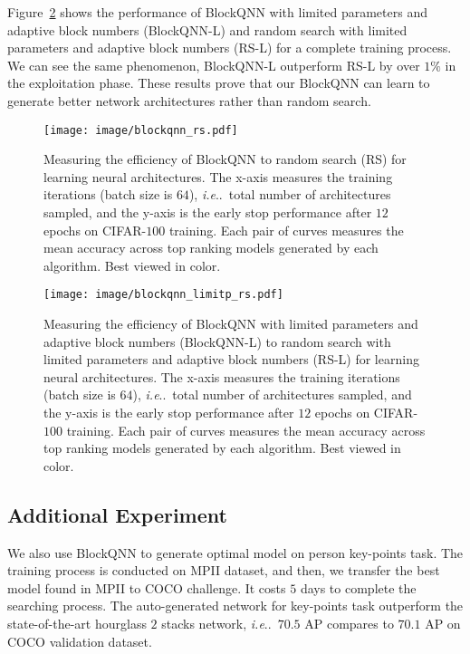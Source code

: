 \documentclass[10pt,journal,compsoc]{IEEEtran}
\makeatletter
\DeclareRobustCommand\onedot{\futurelet\@let@token\@onedot}
\def\@onedot{\ifx\@let@token.\else.\null\fi\xspace}
\def\ie{\emph{i.e}\onedot} \def\Ie{\emph{I.e}\onedot}
\makeatother
\begin{document}
Figure~\ref{fig:2} shows the performance of BlockQNN with limited parameters and adaptive block numbers (BlockQNN-L) and random search with limited parameters and adaptive block numbers (RS-L) for a complete training process. We can see the same phenomenon, BlockQNN-L outperform RS-L by over $1\%$ in the exploitation phase. These results prove that our BlockQNN can learn to generate better network architectures rather than random search.



\begin{figure}[t!]
	\centering
	\texttt{[image: image/blockqnn\_rs.pdf]}
	\caption{Measuring the efficiency of BlockQNN to random search (RS) for learning neural architectures. The x-axis measures the training iterations (batch size is $64$), \ie~total number of architectures sampled, and the y-axis is the early stop performance after $12$ epochs on CIFAR-$100$ training. Each pair of curves measures the mean accuracy across top ranking models generated by each algorithm. Best viewed in color.}
	\label{fig:1}
	\vspace{-0.1cm}
\end{figure}

\begin{figure}[t!]
	\centering
	\texttt{[image: image/blockqnn\_limitp\_rs.pdf]}
	\caption{Measuring the efficiency of BlockQNN with limited parameters and adaptive block numbers (BlockQNN-L) to random search with limited parameters and adaptive block numbers (RS-L) for learning neural architectures. The x-axis measures the training iterations (batch size is $64$), \ie~total number of architectures sampled, and the y-axis is the early stop performance after $12$ epochs on CIFAR-$100$ training. Each pair of curves measures the mean accuracy across top ranking models generated by each algorithm. Best viewed in color.}
	\label{fig:2}
	\vspace{-0.1cm}
\end{figure}











\subsection{Additional Experiment}
We also use BlockQNN to generate optimal model on person key-points task. The training process is conducted on MPII dataset, and then, we transfer the best model found in MPII to COCO challenge. It costs $5$ days to complete the searching process. The auto-generated network for key-points task outperform the state-of-the-art hourglass $2$ stacks network, \ie~$70.5$ AP compares to $70.1$ AP on COCO validation dataset.
\end{document}
